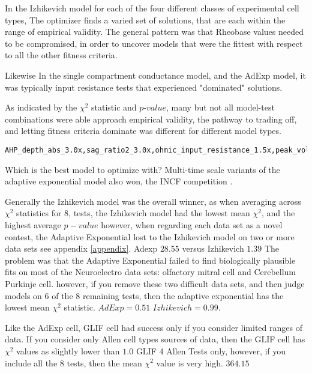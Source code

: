 In the Izhikevich model for each of the four different classes of experimental cell types, The optimizer finds a varied set of solutions, that are each within the range of empirical validity. The general pattern was that Rheobase values needed to be compromised, in order to uncover models that were the fittest with respect to all the other fitness criteria.

Likewise In the single compartment conductance model, and the AdExp model, it was typically input resistance tests that experienced "dominated" solutions. 

As indicated by the $\chi^{2}$ statistic and $p$-$value$, many but not all model-test combinations were able approach empirical validity, the pathway to trading off, and letting fitness criteria dominate was different for different model types.




\begin{verbatim}
AHP_depth_abs_3.0x,sag_ratio2_3.0x,ohmic_input_resistance_1.5x,peak_voltage_3.0x,voltage_base_3.0x,Spikecount_3.0x,ohmic_input_resistance_vb_ssse_1.5x. 
\end{verbatim}



Which is the best model to optimize with?
Multi-time scale variants of the adaptive exponential model also won, the INCF competition \cite{incf_multi}.

Generally the Izhikevich model was the overall winner, as when averaging across $\chi^{2}$ statistics for 8, tests, the Izhikevich model had the lowest mean $\chi^{2}$, and the highest average $p-value$ however, when regarding each data set as a novel contest, the Adaptive Exponential lost to the Izhikevich model on two or more data sets see appendix \ref{appendix}.
Adexp $28.55$ versus 
Izhikevich $1.39$
The problem was that the Adaptive Exponential failed to find biologically plausible fits on most of the Neuroelectro data sets: olfactory mitral cell and Cerebellum Purkinje cell. however, if you remove these two difficult data sets, and then judge models on 6 of the 8 remaining tests, then the adaptive exponential has the lowest mean $\chi^{2}$ statistic. $AdExp=0.51$	$Izhikevich=0.99$.

Like the AdExp cell, GLIF cell had success only if you consider limited ranges of data. If you consider only Allen cell types sources of data, then the GLIF cell has $\chi^{2}$ values as slightly lower than $1.0$ GLIF 4 Allen Tests only, however, if you include all the 8 tests, then the mean $\chi^{2}$ value is very high. $364.15$

